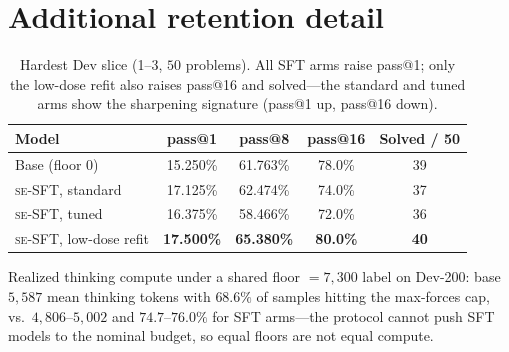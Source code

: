\documentclass{article}
\makeatletter
\newcommand{\se}{\textnormal{\textsc{se}}}
\newcommand{\pass}[1]{pass@#1}
\makeatother
\begin{document}
\section{Additional retention detail}
\label{app:dev13}

\begin{table}[h]
\caption{Hardest Dev slice (1--3, $50$ problems). All SFT arms raise \pass{1}; only the low-dose refit also raises \pass{16} and solved---the standard and tuned arms show the sharpening signature (\pass{1} up, \pass{16} down).}
\label{tab:dev13}
\centering
\small
\begin{tabular}{lcccc}
\toprule
Model & \pass{1} & \pass{8} & \pass{16} & Solved / 50 \\
\midrule
Base (floor $0$) & 15.250\% & 61.763\% & 78.0\% & 39 \\
\se{}-SFT, standard & 17.125\% & 62.474\% & 74.0\% & 37 \\
\se{}-SFT, tuned & 16.375\% & 58.466\% & 72.0\% & 36 \\
\se{}-SFT, low-dose refit & \textbf{17.500\%} & \textbf{65.380\%} & \textbf{80.0\%} & \textbf{40} \\
\bottomrule
\end{tabular}
\end{table}

Realized thinking compute under a shared floor $=7{,}300$ label on Dev-200: base $5{,}587$ mean thinking tokens with $68.6\%$ of samples hitting the max-forces cap, vs.\ $4{,}806$--$5{,}002$ and $74.7$--$76.0\%$ for SFT arms---the protocol cannot push SFT models to the nominal budget, so equal floors are not equal compute.
\end{document}
